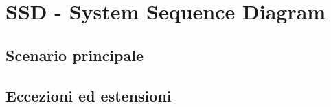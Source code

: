 \chapter{SSD - System Sequence Diagram}

\section{Scenario principale}

\section{Eccezioni ed estensioni}